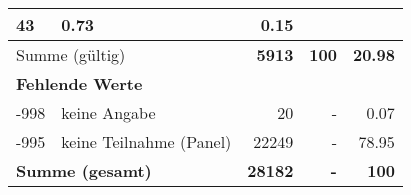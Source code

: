 \begin{longtable}{lXrrr}
       \num{43} &
       \num[round-mode=places,round-precision=2]{0.73} &
         \num[round-mode=places,round-precision=2]{0.15} \\
     \midrule
     \multicolumn{2}{l}{Summe (gültig)} &
       \textbf{\num{5913}} &
     \textbf{100} &
       \textbf{\num[round-mode=places,round-precision=2]{20.98}} \\
     \multicolumn{5}{l}{\textbf{Fehlende Werte}}\\
       -998 &
       keine Angabe &
         \num{20} &
        - &
         \num[round-mode=places,round-precision=2]{0.07} \\
       -995 &
       keine Teilnahme (Panel) &
         \num{22249} &
        - &
         \num[round-mode=places,round-precision=2]{78.95} \\
     \midrule
     \multicolumn{2}{l}{\textbf{Summe (gesamt)}} &
          \textbf{\num{28182}} &
        \textbf{-} &
        \textbf{100} \\
     \bottomrule
     \end{longtable}
     
